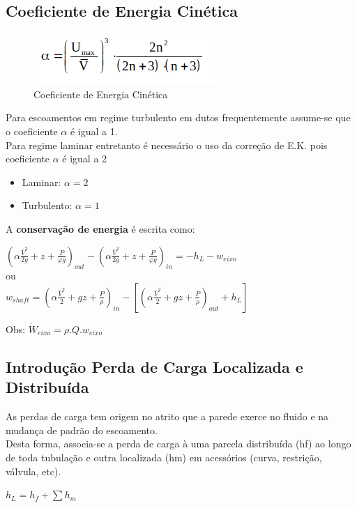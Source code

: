 \documentclass[a4paper, 12pt]{article}
\begin{document}
\subsection{Coeficiente de Energia Cinética}
	\begin{figure}[h]
		\centering
		\includegraphics[width=0.4\linewidth]{imagens/coe}
		\caption{Coeficiente de Energia Cinética}
		\label{fig:coe}
	\end{figure}
	
	Para escoamentos em regime turbulento em dutos frequentemente assume-se que o coeficiente $\alpha$ é igual a 1.\\
	
	Para regime laminar entretanto é necessário o uso da correção de E.K. pois coeficiente $\alpha$ é igual a 2 
	
	\begin{itemize}
		\item Laminar: $\alpha = 2$
		\item Turbulento: $\alpha = 1$	
	\end{itemize}

	A \textbf{conservação de energia} é escrita como:
	\begin{center}
		\Large
		$
		(\alpha \frac{\bar{V}^2}{2g} + z + \frac{P}{\varphi g})_{out} - (\alpha \frac{\bar{V}^2}{2g} + z + \frac{P}{\varphi g})_{in} = -h_L - w_{eixo}
		$\\ou\\
		
		$
		w_{shaft} = (\alpha \frac{\bar{V}^2}{2} +gz + \frac{P}{\rho})_{in} - [(\alpha \frac{\bar{V}^2}{2} + gz + \frac{P}{\rho})_{out} + h_L]
		$
	\end{center}
	Obs: 
		$\dot{W}_{eixo}= \rho .Q.w_{eixo} $
	
\subsection{Introdução Perda de Carga Localizada e Distribuída}
	As perdas de carga tem origem no atrito que a parede exerce no fluido e na mudança de padrão do escoamento.\\
	 
	Desta forma, associa-se a perda de carga à uma parcela distribuída (hf) ao longo de toda tubulação e outra localizada (hm) em acessórios (curva, restrição, válvula, etc).
	\begin{center}
		\Large
		$
		h_{L} = h_{f} + \sum h_m
		$
	\end{center}
\end{document}
